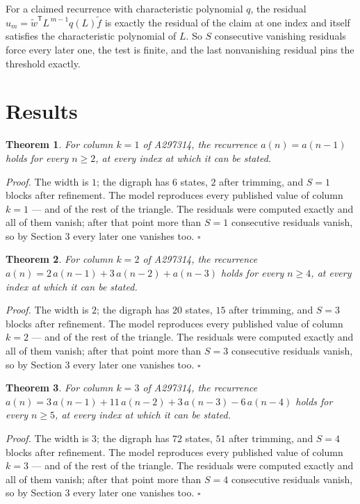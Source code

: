 \documentclass[11pt]{article}
\newtheorem{theorem}{Theorem}
\theoremstyle{definition}
\begin{document}
For a claimed recurrence with characteristic polynomial $q$, the residual $u_m = \tilde w^{\mathsf T}L^{\,m-1}q(L)\tilde f$ is exactly the residual of the claim at one index and itself satisfies the characteristic polynomial of $L$. So $S$ consecutive vanishing residuals force every later one, the test is finite, and the last nonvanishing residual pins the threshold exactly.

\section{Results}

\begin{theorem} For column $k = 1$ of A297314, the recurrence $a(n) = a(n-1)$ holds for every $n \ge 2$, at every index at which it can be stated.\end{theorem}

{\itshape Proof.} The width is $1$; the digraph has $6$ states, $2$ after trimming, and $S = 1$ blocks after refinement. The model reproduces every published value of column $k = 1$ --- and of the rest of the triangle. The residuals were computed exactly and all of them vanish; after that point more than $S = 1$ consecutive residuals vanish, so by Section 3 every later one vanishes too. $\square$

\begin{theorem} For column $k = 2$ of A297314, the recurrence $a(n) = 2\,a(n-1) + 3\,a(n-2) + a(n-3)$ holds for every $n \ge 4$, at every index at which it can be stated.\end{theorem}

{\itshape Proof.} The width is $2$; the digraph has $20$ states, $15$ after trimming, and $S = 3$ blocks after refinement. The model reproduces every published value of column $k = 2$ --- and of the rest of the triangle. The residuals were computed exactly and all of them vanish; after that point more than $S = 3$ consecutive residuals vanish, so by Section 3 every later one vanishes too. $\square$

\begin{theorem} For column $k = 3$ of A297314, the recurrence $a(n) = 3\,a(n-1) + 11\,a(n-2) + 3\,a(n-3) - 6\,a(n-4)$ holds for every $n \ge 5$, at every index at which it can be stated.\end{theorem}

{\itshape Proof.} The width is $3$; the digraph has $72$ states, $51$ after trimming, and $S = 4$ blocks after refinement. The model reproduces every published value of column $k = 3$ --- and of the rest of the triangle. The residuals were computed exactly and all of them vanish; after that point more than $S = 4$ consecutive residuals vanish, so by Section 3 every later one vanishes too. $\square$
\end{document}
